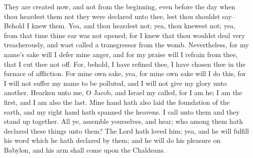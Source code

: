 They are created now, and not from the beginning, even before the day when thou heardest them not they were declared unto thee, lest thou shouldst say--Behold I knew them.
\bverse \iffalse Yea, and thou heardest not; yea, thou knewest not; yea, from that time thine ear was not opened; for I knew that thou wouldst deal very treacherously, and wast called a transgressor from the womb. \fi
Yea, and thou heardest not; yea, thou knewest not; yea, from that time thine ear was not opened; for I knew that thou wouldst deal very treacherously, and wast called a transgressor from the womb.
\bverse \iffalse Nevertheless, for my name's sake will I defer mine anger, and for my praise will I refrain from thee, that I cut thee not off. \fi
Nevertheless, for my name's sake will I defer mine anger, and for my praise will I refrain from thee, that I cut thee not off.
\bverse \iffalse For, behold, I have refined thee, I have chosen thee in the furnace of affliction. \fi
For, behold, I have refined thee, I have chosen thee in the furnace of affliction.
\bverse \iffalse For mine own sake, yea, for mine own sake will I do this, for I will not suffer my name to be polluted, and I will not give my glory unto another. \fi
For mine own sake, yea, for mine own sake will I do this, for I will not suffer my name to be polluted, and I will not give my glory unto another.
\bverse \iffalse Hearken unto me, O Jacob, and Israel my called, for I am he; I am the first, and I am also the last. \fi
Hearken unto me, O Jacob, and Israel my called, for I am he; I am the first, and I am also the last.
\bverse \iffalse Mine hand hath also laid the foundation of the earth, and my right hand hath spanned the heavens. I call unto them and they stand up together. \fi
Mine hand hath also laid the foundation of the earth, and my right hand hath spanned the heavens. I call unto them and they stand up together.
\bverse \iffalse All ye, assemble yourselves, and hear; who among them hath declared these things unto them? The Lord hath loved him; yea, and he will fulfill his word which he hath declared by them; and he will do his pleasure on Babylon, and his arm shall come upon the Chaldeans. \fi
All ye, assemble yourselves, and hear; who among them hath declared these things unto them? The Lord hath loved him; yea, and he will fulfill his word which he hath declared by them; and he will do his pleasure on Babylon, and his arm shall come upon the Chaldeans.
\bverse \iffalse Also, saith the Lord; I the Lord, yea, I have spoken; yea, I have called him to declare, I have brought him, and he shall make his way prosperous. \fi
